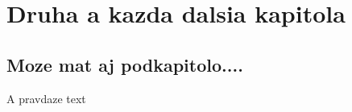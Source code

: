 \chapter{Druha a kazda dalsia kapitola}\label{chap:next}

\section{Moze mat aj podkapitolo....}\label{sec:another}

A pravdaze text
